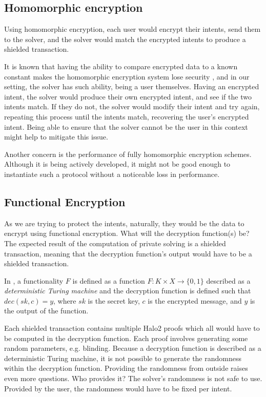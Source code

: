 \documentclass[
    9pt,            %
    report,        %
    affiltop,       %
]{art}
\begin{document}
\subsection{Homomorphic encryption}

Using homomorphic encryption, each user would encrypt their intents, send them to the solver, and the solver would match the encrypted intents to produce a shielded transaction.

\hfill

It is known that having the ability to compare encrypted data to a known constant makes the homomorphic encryption system lose security \cite{databanks}, and in our setting, the solver has such ability, being a user themselves. Having an encrypted intent, the solver would produce their own encrypted intent, and see if the two intents match. If they do not, the solver would modify their intent and try again, repeating this process until the intents match, recovering the user's encrypted intent. Being able to ensure that the solver cannot be the user in this context might help to mitigate this issue.

\hfill

Another concern is the performance of fully homomorphic encryption schemes. Although it is being actively developed, it might not be good enough to instantiate such a protocol without a noticeable loss in performance.

\subsection{Functional Encryption}

As we are trying to protect the intents, naturally, they would be the data to encrypt using functional encryption. What will the decryption function(s) be? The expected result of the computation of private solving is a shielded transaction, meaning that the decryption function's output would have to be a shielded transaction.

\hfill

In \cite{fe}, a functionality $F$ is defined as a function $F: K \times X \rightarrow \{0, 1\}$ described as a \textit{deterministic Turing machine} and the decryption function is defined such that $dec(sk, c) = y$, where $sk$ is the secret key, $c$ is the encrypted message, and $y$ is the output of the function.

Each shielded transaction contains multiple Halo2 proofs which all would have to be computed in the decryption function. Each proof involves generating some random parameters, e.g. blinding. Because a decryption function is described as a deterministic Turing machine, it is not possible to generate the randomness within the decryption function. Providing the randomness from outside raises even more questions. Who provides it? The solver's randomness is not safe to use. Provided by the user, the randomness would have to be fixed per intent.
\end{document}
